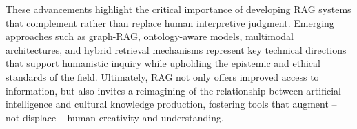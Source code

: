 \begin{spacing}{1.5}
These advancements highlight the critical importance of developing RAG systems that complement rather than replace human interpretive judgment. Emerging approaches such as graph-RAG, ontology-aware models, multimodal architectures, and hybrid retrieval mechanisms represent key technical directions that support humanistic inquiry while upholding the epistemic and ethical standards of the field. Ultimately, RAG not only offers improved access to information, but also invites a reimagining of the relationship between artificial intelligence and cultural knowledge production, fostering tools that augment – not displace – human creativity and understanding.
\end{spacing}